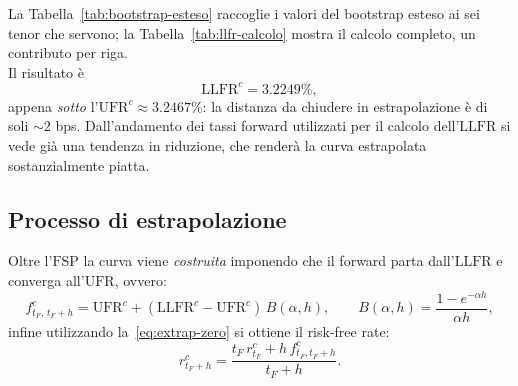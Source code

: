 \documentclass[11pt,a4paper]{article}
\theoremstyle{plain}
\theoremstyle{definition}
\theoremstyle{remark}
\newcommand{\UFR}{\mathrm{UFR}}
\newcommand{\LLFR}{\mathrm{LLFR}}
\newcommand{\FSP}{\mathrm{FSP}}
\begin{document}
La Tabella~\ref{tab:bootstrap-esteso} raccoglie i valori del bootstrap esteso ai sei tenor che
servono; la Tabella~\ref{tab:llfr-calcolo} mostra il calcolo completo, un contributo per riga. $\ $ \\





Il risultato \`e
\[
  \LLFR^c = 3.2249\% ,
\]
appena \emph{sotto} l'$\UFR^c \approx 3.2467\%$: la distanza da chiudere in estrapolazione \`e
di soli $\sim\!2$ bps. Dall'andamento dei tassi forward utilizzati per il calcolo dell'$\LLFR$
si vede gi\`a una tendenza in riduzione, che render\`a la curva estrapolata sostanzialmente
piatta.

\subsection{Processo di estrapolazione}
\label{sec:estrapolazione-calcolo}

Oltre l'$\FSP$ la curva viene  \emph{costruita} imponendo che il forward parta dall'$\LLFR$ e converga
all'$\UFR$, ovvero:
\[
  f^c_{t_F,\,t_F+h} = \UFR^c + (\LLFR^c - \UFR^c)\,B(\alpha,h),
  \qquad B(\alpha,h) = \frac{1-e^{-\alpha h}}{\alpha h},
\]
infine utilizzando la~\eqref{eq:extrap-zero} si ottiene il risk-free rate:
\[
  r^c_{t_F+h} = \frac{t_F\,r^c_{t_F} + h\,f^c_{t_F,t_F+h}}{t_F+h}.
\]
\end{document}
